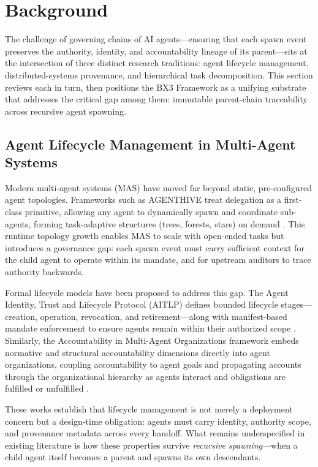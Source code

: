 \section{Background}

The challenge of governing chains of AI agents---ensuring that each spawn event preserves the authority, identity, and accountability lineage of its parent---sits at the intersection of three distinct research traditions: agent lifecycle management, distributed-systems provenance, and hierarchical task decomposition. This section reviews each in turn, then positions the BX3 Framework as a unifying substrate that addresses the critical gap among them: immutable parent-chain traceability across recursive agent spawning.

\subsection{Agent Lifecycle Management in Multi-Agent Systems}

Modern multi-agent systems (MAS) have moved far beyond static, pre-configured agent topologies. Frameworks such as AGENTHIVE treat delegation as a first-class primitive, allowing any agent to dynamically spawn and coordinate sub-agents, forming task-adaptive structures (trees, forests, stars) on demand \cite{agenthive}. This runtime topology growth enables MAS to scale with open-ended tasks but introduces a governance gap: each spawn event must carry sufficient context for the child agent to operate within its mandate, and for upstream auditors to trace authority backwards.

Formal lifecycle models have been proposed to address this gap. The Agent Identity, Trust and Lifecycle Protocol (AITLP) defines bounded lifecycle stages---creation, operation, revocation, and retirement---along with manifest-based mandate enforcement to ensure agents remain within their authorized scope \cite{aitlp}. Similarly, the Accountability in Multi-Agent Organizations framework embeds normative and structural accountability dimensions directly into agent organizations, coupling accountability to agent goals and propagating accounts through the organizational hierarchy as agents interact and obligations are fulfilled or unfulfilled \cite{accountability-mas}.

These works establish that lifecycle management is not merely a deployment concern but a design-time obligation: agents must carry identity, authority scope, and provenance metadata across every handoff. What remains underspecified in existing literature is how these properties survive \emph{recursive spawning}---when a child agent itself becomes a parent and spawns its own descendants.

